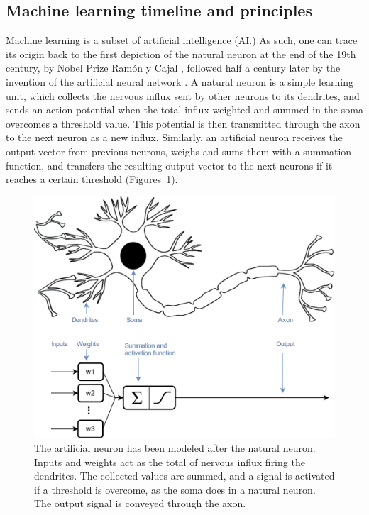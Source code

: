 \subsection{Machine learning timeline and principles}

Machine learning is a subset of artificial intelligence (AI.) As such, one can trace its origin back to the first depiction of the natural neuron at the end of the 19th century, by Nobel Prize Ramón y Cajal \cite{Lopez2006}, followed half a century later by the invention of the artificial neural network \cite{Mcculloch1943}. A natural neuron is a simple learning unit, which collects the nervous influx sent by other neurons to its dendrites, and sends an action potential when the total influx weighted and summed in the soma overcomes a threshold value. This potential is then transmitted through the axon to the next neuron as a new influx. Similarly, an artificial neuron receives the output vector from previous neurons, weighs and sums them with a summation function, and transfers the resulting output vector to the next neurons if it reaches a certain threshold (Figures~\ref{fig_neuron}). 

\begin{figure}[hbtp]
	\centering
	\def\svgwidth{1\columnwidth}
	\fontsize{10pt}{10pt}\selectfont
	\includegraphics[width=\linewidth]{"../Chap2/Figures/Fig_neuron.png"}
	\caption{The artificial neuron has been modeled after the natural neuron. Inputs and weights act as the total of nervous influx firing the dendrites. The collected values are summed, and a signal is activated if a threshold is overcome, as the soma does in a natural neuron. The output signal is conveyed through the axon.}
	\label{fig_neuron}
\end{figure}


